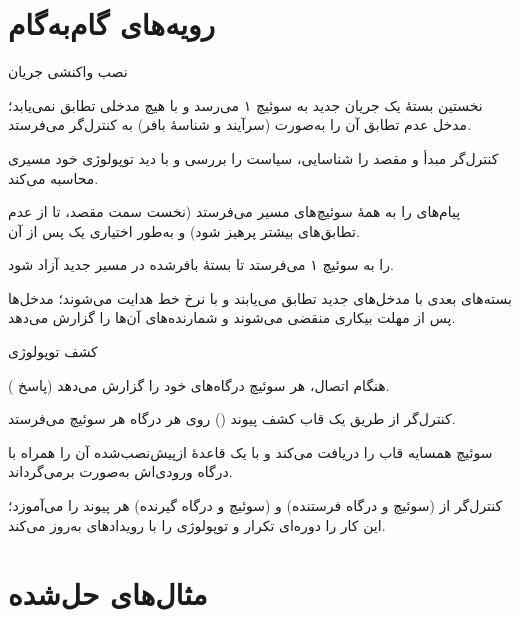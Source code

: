 \documentclass[11pt,a4paper]{article}
\begin{document}
\section{رویه‌های گام‌به‌گام}

\begin{procedurebox}{نصب واکنشی جریان}\label{proc:reactive}
\begin{steps}
  \item نخستین بستهٔ یک جریان جدید به سوئیچ ۱ می‌رسد و با هیچ مدخلی تطابق نمی‌یابد؛ مدخل عدم تطابق آن را به‌صورت
         (سرآیند و شناسهٔ بافر) به کنترل‌گر می‌فرستد.
  \item کنترل‌گر مبدأ و مقصد را شناسایی، سیاست را بررسی و با دید توپولوژی خود مسیری محاسبه می‌کند.
  \item پیام‌های  را به همهٔ سوئیچ‌های مسیر می‌فرستد (نخست سمت مقصد، تا از عدم تطابق‌های بیشتر پرهیز شود) و
        به‌طور اختیاری یک  پس از آن.
  \item {} را به سوئیچ ۱ می‌فرستد تا بستهٔ بافرشده در مسیر جدید آزاد شود.
  \item بسته‌های بعدی با مدخل‌های جدید تطابق می‌یابند و با نرخ خط هدایت می‌شوند؛ مدخل‌ها پس از مهلت بیکاری منقضی می‌شوند و
         شمارنده‌های آن‌ها را گزارش می‌دهد.
\end{steps}
\end{procedurebox}

\begin{procedurebox}{کشف توپولوژی}\label{proc:lldp}
\begin{steps}
  \item هنگام اتصال، هر سوئیچ درگاه‌های خود را گزارش می‌دهد (پاسخ ).
  \item کنترل‌گر از طریق  یک قاب کشف پیوند () روی هر درگاه هر سوئیچ می‌فرستد.
  \item سوئیچ همسایه قاب را دریافت می‌کند و با یک قاعدهٔ ازپیش‌نصب‌شده آن را همراه با درگاه ورودی‌اش به‌صورت 
        برمی‌گرداند.
  \item کنترل‌گر از (سوئیچ و درگاه فرستنده) و (سوئیچ و درگاه گیرنده) هر پیوند را می‌آموزد؛ این کار را دوره‌ای تکرار و توپولوژی
        را با رویدادهای  به‌روز می‌کند.
\end{steps}
\end{procedurebox}

\section{مثال‌های حل‌شده}
\end{document}
